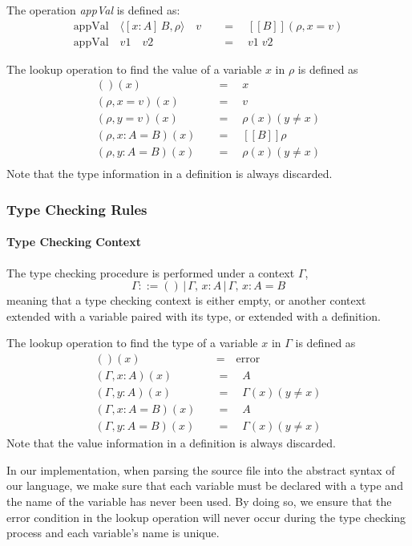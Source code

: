 \documentclass{article}
\theoremstyle{remark}
\begin{document}
The operation \emph{appVal} is defined as:
\begin{align*}
  \text{appVal} \quad \langle [x : A]\,B, \rho \rangle \quad v \quad &= \quad [\![B]\!](\rho, x = v) \\
  \text{appVal} \quad v1 \quad v2 \quad &= \quad v1\;v2
\end{align*}

The lookup operation to find the value of a variable $x$ in $\rho$ is defined as
\begin{align*}
  ()(x) \quad &= \quad x \\
  (\rho, x = v)(x) \quad &= \quad v \\
  (\rho, y = v)(x) \quad &= \quad \rho(x)(y \neq x) \\
  (\rho, x : A = B)(x) \quad &= \quad [\![B]\!]\rho \\
  (\rho, y : A = B)(x) \quad &= \quad \rho(x)(y \neq x) \\
\end{align*}
Note that the type information in a definition is always discarded.

\subsubsection{Type Checking Rules}
\paragraph{Type Checking Context}
The type checking procedure is performed under a context $\Gamma$,
\[
  \Gamma ::= ()\,|\,\Gamma,\,x : A\,|\,\Gamma,\,x : A = B
\]
meaning that a type checking context is either empty, or another context extended with a variable paired with its type, or extended with a definition.

The lookup operation to find the type of a variable $x$ in $\Gamma$ is defined as
\begin{align*}
  ()(x) \quad &= \quad \text{error} \\
  (\Gamma, x : A)(x) \quad &= \quad A \\
  (\Gamma, y : A)(x) \quad &= \quad \Gamma(x)(y \neq x) \\
  (\Gamma, x : A = B)(x) \quad &= \quad A \\
  (\Gamma, y : A = B)(x) \quad &= \quad \Gamma(x)(y \neq x) 
\end{align*}
Note that the value information in a definition is always discarded.

In our implementation, when parsing the source file into the abstract syntax of our language, we make sure that each variable must be declared with a type and the name of the variable has never been used. By doing so, we ensure that the error condition in the lookup operation will never occur during the type checking process and each variable's name is unique.
\end{document}
